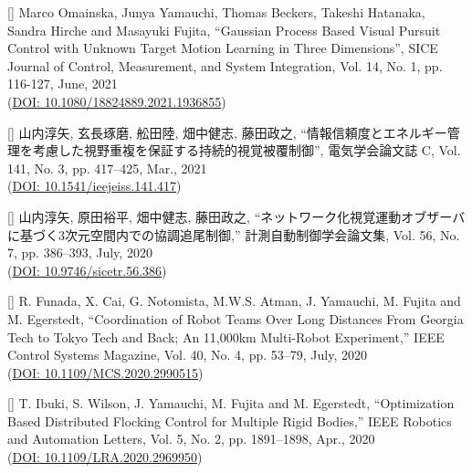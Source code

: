 \documentclass[letterpaper]{article}
\newcounter{trans}
\begin{document}
[]  
  Marco Omainska, Junya Yamauchi, Thomas Beckers, Takeshi Hatanaka, Sandra Hirche and Masayuki Fujita, 
  ``Gaussian Process Based Visual Pursuit Control with Unknown Target Motion Learning in Three Dimensions'', 
  SICE Journal of Control, Measurement, and System Integration, Vol. 14, No. 1, pp. 116-127, June, 2021 \\
  (\href{https://www.tandfonline.com/doi/full/10.1080/18824889.2021.1936855}{DOI: 10.1080/18824889.2021.1936855}) \\
\addtocounter{trans}{-1}

[]  
  山内淳矢, 玄長琢磨, 舩田陸, 畑中健志, 藤田政之, 
  ``情報信頼度とエネルギー管理を考慮した視野重複を保証する持続的視覚被覆制御'', 
  電気学会論文誌 C, Vol. 141, No. 3, pp. 417--425, Mar., 2021 \\
  (\href{https://www.jstage.jst.go.jp/article/ieejeiss/141/3/141_417/_article/-char/ja/}{DOI: 10.1541/ieejeiss.141.417}) \\
\addtocounter{trans}{-1}

[] 
  山内淳矢, 原田裕平, 畑中健志, 藤田政之, 
  ``ネットワーク化視覚運動オブザーバに基づく3次元空間内での協調追尾制御,'' 
  計測自動制御学会論文集, Vol. 56, No. 7, pp. 386--393, July, 2020 \\
  (\href{https://www.jstage.jst.go.jp/article/sicetr/56/7/56_386/_article/-char/ja/}{DOI: 10.9746/sicetr.56.386}) \\
\addtocounter{trans}{-1}

[] 
  R. Funada, X. Cai, G. Notomista, M.W.S. Atman, J. Yamauchi, M. Fujita and M. Egerstedt, 
  ``Coordination of Robot Teams Over Long Distances From Georgia Tech to Tokyo Tech and Back; An 11,000km Multi-Robot Experiment,'' 
  IEEE Control Systems Magazine, Vol. 40, No. 4, pp. 53--79, July, 2020 \\ 
  (\href{https://ieeexplore.ieee.org/document/9143250}{DOI: 10.1109/MCS.2020.2990515}) \\
\addtocounter{trans}{-1}

[]  
  T. Ibuki, S. Wilson, J. Yamauchi, M. Fujita and M. Egerstedt, 
  ``Optimization Based Distributed Flocking Control for Multiple Rigid Bodies,'' 
  IEEE Robotics and Automation Letters, Vol. 5, No. 2, pp. 1891--1898, Apr., 2020 \\
  (\href{https://ieeexplore.ieee.org/document/8972380}{DOI: 10.1109/LRA.2020.2969950}) \\
\addtocounter{trans}{-1}
\end{document}
